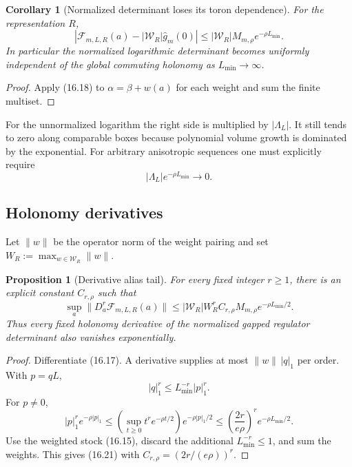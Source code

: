 \documentclass[11pt]{article}
\newtheorem{proposition}[theorem]{Proposition}
\newtheorem{corollary}[theorem]{Corollary}
\begin{document}
\begin{corollary}[Normalized determinant loses its toron dependence]
\label{cor:v11v16-normalized}
For the representation \(R\),
\[
 \left|
 \mathcal F_{m,L,R}(a)
 -
 |\mathcal W_R|\widehat g_m(0)
 \right|
 \leq
 |\mathcal W_R|M_{m,\rho}e^{-\rho L_{\min}}.
 \tag{16.19}
\]
In particular the normalized logarithmic determinant becomes uniformly
independent of the global commuting holonomy as \(L_{\min}\to\infty\).
\end{corollary}

\begin{proof}
Apply (16.18) to
\(\alpha=\beta+w(a)\) for each weight and sum the finite multiset.
\end{proof}

For the unnormalized logarithm the right side is multiplied by
\(|\Lambda_L|\).  It still tends to zero along comparable boxes because
polynomial volume growth is dominated by the exponential.  For arbitrary
anisotropic sequences one must explicitly require
\[
 |\Lambda_L|e^{-\rho L_{\min}}\longrightarrow0.
 \tag{16.20}
\]

\subsection{Holonomy derivatives}

Let \(\|w\|\) be the operator norm of the weight pairing and set
\(W_R:=\max_{w\in\mathcal W_R}\|w\|\).

\begin{proposition}[Derivative alias tail]
\label{prop:v11v16-derivative}
For every fixed integer \(r\geq1\), there is an explicit constant
\(C_{r,\rho}\) such that
\[
 \sup_a
 \|D_a^r\mathcal F_{m,L,R}(a)\|
 \leq
 |\mathcal W_R|W_R^r
 C_{r,\rho}M_{m,\rho}
 e^{-\rho L_{\min}/2}.
 \tag{16.21}
\]
Thus every fixed holonomy derivative of the normalized gapped regulator
determinant also vanishes exponentially.
\end{proposition}

\begin{proof}
Differentiate (16.17).  A derivative supplies at most
\(\|w\|\,|q|_1\) per order.  With \(p=qL\),
\[
 |q|_1^r\leq L_{\min}^{-r}|p|_1^r.
\]
For \(p\ne0\),
\[
 |p|_1^re^{-\rho|p|_1}
 \leq
 \left(\sup_{t\geq0}t^re^{-\rho t/2}\right)
 e^{-\rho|p|_1/2}
 \leq
 \left(\frac{2r}{e\rho}\right)^r
 e^{-\rho L_{\min}/2}.
\]
Use the weighted stock (16.15), discard the additional
\(L_{\min}^{-r}\leq1\), and sum the weights.  This gives (16.21) with
\(C_{r,\rho}=(2r/(e\rho))^r\).
\end{proof}
\end{document}
